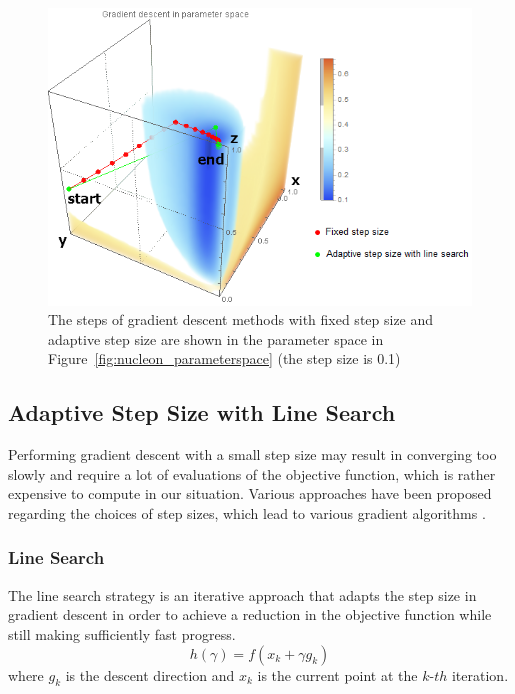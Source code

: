 \begin{figure}
	\centering
	\begin{minipage}{.9\textwidth}
		\includegraphics[width=1\linewidth]{images/nucleon_strong_red_parameterspace_path}
	\end{minipage}
	\caption[The steps of gradient descent methods with fixed step size and adaptive step size are shown in the parameter space]{The steps of gradient descent methods with fixed step size and adaptive step size are shown in the parameter space in Figure~\ref{fig:nucleon_parameterspace} (the step size is 0.1)}
	\label{fig:nucleon_parameterspace_path}
\end{figure}

\subsection{Adaptive Step Size with Line Search}
Performing gradient descent with a small step size may result in converging too slowly and require a lot of evaluations of the objective function, which is rather expensive to compute in our situation. Various approaches have been proposed regarding the choices of step sizes, which lead to various gradient algorithms \cite{yuan_step-sizes_2008}.

\subsubsection{Line Search}
The line search strategy is an iterative approach that adapts the step size in gradient descent in order to achieve a reduction in the objective function while still making sufficiently fast progress.
\[ h( \gamma)=f(x_{k}+\gamma g_{k}) \]
where $ g_{k} $ is the descent direction and $ x_{k} $ is the current point at the $ k$-$th $ iteration.

